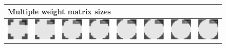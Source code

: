 \documentclass{itatnew}
\begin{document}
\begin{figure}[htp]
  \centering
  \begin{tabular}{cccccccc}
    \multicolumn{8}{l}{Multiple weight matrix sizes} \\
    \hline
    \includegraphics[width=4.6em]{images/gen-blur-wmatrices-1}&
    \includegraphics[width=4.6em]{images/gen-blur-wmatrices-2}&
    \includegraphics[width=4.6em]{images/gen-blur-wmatrices-3}&
    \includegraphics[width=4.6em]{images/gen-blur-wmatrices-4}&
    \includegraphics[width=4.6em]{images/gen-blur-wmatrices-5}&
    \includegraphics[width=4.6em]{images/gen-blur-wmatrices-6}&
    \includegraphics[width=4.6em]{images/gen-blur-wmatrices-7}&
    \includegraphics[width=4.6em]{images/gen-blur-wmatrices-8}
  \end{tabular}

\end{figure}
\end{document}
